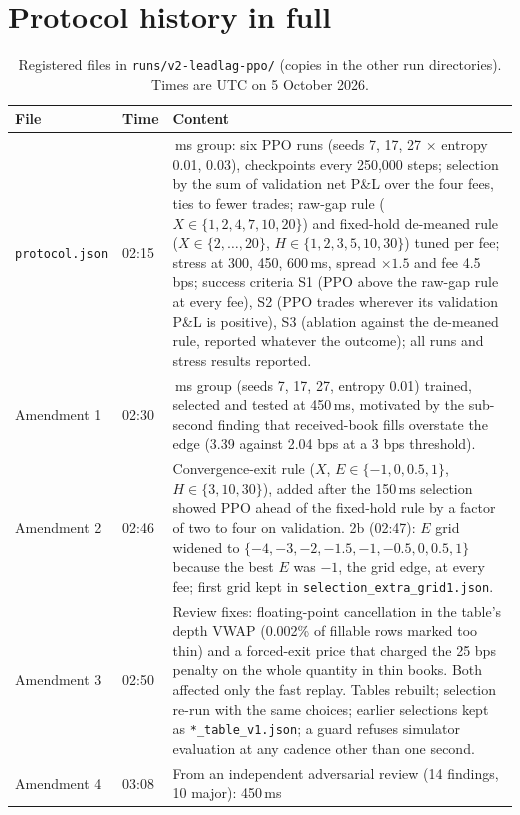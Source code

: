 \documentclass[12pt,a4paper]{article}
\DeclareRobustCommand{\bps}{\ifmmode\,\text{bps}\else\,bps\fi}
\begin{document}
\section{Protocol history in full}\label{app:protocol}
\begin{table}[H]
\centering
\caption{Registered files in \texttt{runs/v2-leadlag-ppo/} (copies in the other run
directories). Times are UTC on 5 October 2026.}
\label{tab:protocolfull}
\small
\begin{tabularx}{\textwidth}{@{}l l >{\raggedright\arraybackslash}X@{}}
\toprule
File & Time & Content \\
\midrule
\texttt{protocol.json} & 02:15 & 150\,ms group: six PPO runs (seeds 7, 17, 27 $\times$ entropy
0.01, 0.03), checkpoints every 250,000 steps; selection by the sum of validation net P\&L over
the four fees, ties to fewer trades; raw-gap rule ($X\in\{1,2,4,7,10,20\}$) and fixed-hold
de-meaned rule ($X\in\{2,\ldots,20\}$, $H\in\{1,2,3,5,10,30\}$) tuned per fee; stress at 300,
450, 600\,ms, spread $\times1.5$ and fee 4.5\bps; success criteria S1 (PPO above the raw-gap
rule at every fee), S2 (PPO trades wherever its validation P\&L is positive), S3 (ablation
against the de-meaned rule, reported whatever the outcome); all runs and stress results
reported. \\
Amendment 1 & 02:30 & 450\,ms group (seeds 7, 17, 27, entropy 0.01) trained, selected and
tested at 450\,ms, motivated by the sub-second finding that received-book fills overstate the
edge (3.39 against 2.04\bps{} at a 3\bps{} threshold). \\
Amendment 2 & 02:46 & Convergence-exit rule ($X$, $E\in\{-1,0,0.5,1\}$, $H\in\{3,10,30\}$),
added after the 150\,ms selection showed PPO ahead of the fixed-hold rule by a factor of two to
four on validation. 2b (02:47): $E$ grid widened to $\{-4,-3,-2,-1.5,-1,-0.5,0,0.5,1\}$ because the
best $E$ was $-1$, the grid edge, at every fee; first grid kept in
\texttt{selection\_extra\_grid1.json}. \\
Amendment 3 & 02:50 & Review fixes: floating-point cancellation in the table's depth VWAP
(0.002\% of fillable rows marked too thin) and a forced-exit price that charged the 25\bps{}
penalty on the whole quantity in thin books. Both affected only the fast replay. Tables
rebuilt; selection re-run with the same choices; earlier selections kept as
\texttt{*\_table\_v1.json}; a guard refuses simulator evaluation at any cadence other than one
second. \\
Amendment 4 & 03:08 & From an independent adversarial review (14 findings, 10 major): 450\,ms

\end{tabularx}
\end{table}
\end{document}
